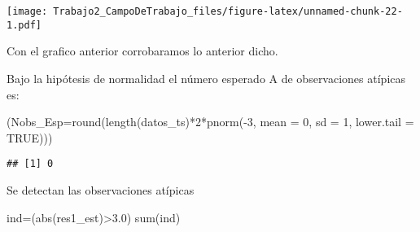 \documentclass[
]{article}
\newenvironment{Shaded}{\begin{snugshade}}{\end{snugshade}}
\newcommand{\AttributeTok}[1]{\textcolor[rgb]{0.77,0.63,0.00}{#1}}
\newcommand{\ConstantTok}[1]{\textcolor[rgb]{0.00,0.00,0.00}{#1}}
\newcommand{\DecValTok}[1]{\textcolor[rgb]{0.00,0.00,0.81}{#1}}
\newcommand{\FloatTok}[1]{\textcolor[rgb]{0.00,0.00,0.81}{#1}}
\newcommand{\FunctionTok}[1]{\textcolor[rgb]{0.00,0.00,0.00}{#1}}
\newcommand{\NormalTok}[1]{#1}
\newcommand{\OtherTok}[1]{\textcolor[rgb]{0.56,0.35,0.01}{#1}}
\newcommand{\SpecialCharTok}[1]{\textcolor[rgb]{0.00,0.00,0.00}{#1}}
\newcommand{\StringTok}[1]{\textcolor[rgb]{0.31,0.60,0.02}{#1}}
\begin{document}
\begin{Shaded}
\end{Shaded}

\texttt{[image: Trabajo2\_CampoDeTrabajo\_files/figure-latex/unnamed-chunk-22-1.pdf]}

Con el grafico anterior corrobaramos lo anterior dicho.

Bajo la hipótesis de normalidad el número esperado A de observaciones
atípicas es:

\begin{Shaded}
\begin{Highlighting}[]
\NormalTok{(}\AttributeTok{Nobs\_Esp=}\FunctionTok{round}\NormalTok{(}\FunctionTok{length}\NormalTok{(datos\_ts)}\SpecialCharTok{*}\DecValTok{2}\SpecialCharTok{*}\FunctionTok{pnorm}\NormalTok{(}\SpecialCharTok{{-}}\DecValTok{3}\NormalTok{, }\AttributeTok{mean =} \DecValTok{0}\NormalTok{, }\AttributeTok{sd =} \DecValTok{1}\NormalTok{, }\AttributeTok{lower.tail =} \ConstantTok{TRUE}\NormalTok{)))}
\end{Highlighting}
\end{Shaded}

\begin{verbatim}
## [1] 0
\end{verbatim}

Se detectan las observaciones atípicas

\begin{Shaded}
\begin{Highlighting}[]
\NormalTok{ind}\OtherTok{=}\NormalTok{(}\FunctionTok{abs}\NormalTok{(res1\_est)}\SpecialCharTok{\textgreater{}}\FloatTok{3.0}\NormalTok{)}
\FunctionTok{sum}\NormalTok{(ind)}
\end{Highlighting}
\end{Shaded}
\end{document}
